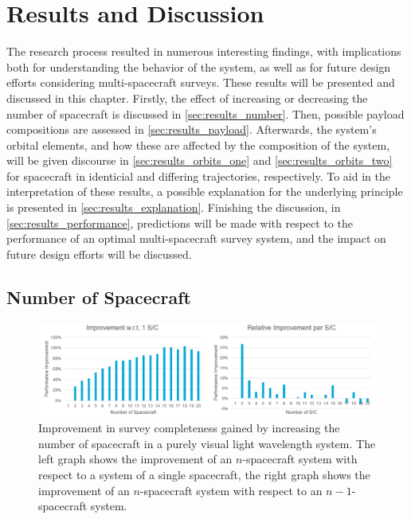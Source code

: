 \chapter{Results and Discussion}
The research process resulted in numerous interesting findings, with implications both for understanding the behavior of the system, as well as for future design efforts considering multi-spacecraft surveys. These results will be presented and discussed in this chapter. Firstly, the effect of increasing or decreasing the number of spacecraft is discussed in \autoref{sec:results_number}. Then, possible payload compositions are assessed in \autoref{sec:results_payload}. Afterwards, the system's orbital elements, and how these are affected by the composition of the system, will be given discourse in \autoref{sec:results_orbits_one} and \autoref{sec:results_orbits_two} for spacecraft in identicial and differing trajectories, respectively. To aid in the interpretation of these results, a possible explanation for the underlying principle is presented in \autoref{sec:results_explanation}. Finishing the discussion, in \autoref{sec:results_performance}, predictions will be made with respect to the performance of an optimal multi-spacecraft survey system, and the impact on future design efforts will be discussed.

\section{Number of Spacecraft}
\label{sec:results_number}

\begin{figure}[htbp]
 \centering
 \includegraphics[width=1.0\textwidth]{img/number_sc_vis.png}
 \caption{Improvement in survey completeness gained by increasing the number of spacecraft in a purely visual light wavelength system. The left graph shows the improvement of an $n$-spacecraft system with respect to a system of a single spacecraft, the right graph shows the improvement of an $n$-spacecraft system with respect to an $n-1$-spacecraft system.}
 \label{fig:results_number_vis}
\end{figure}


